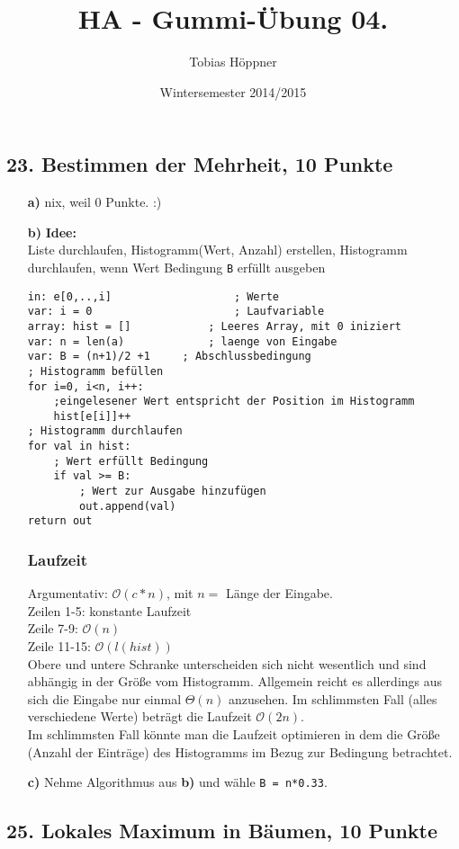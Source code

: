 \documentclass[ngerman,a4paper]{report}
\author{Tobias Höppner}
\title{HA - Gummi-Übung 04. }
\date{Wintersemester 2014/2015}
\renewcommand{\maketitle}{}
\begin{document}
 
\maketitle 

\subsection*{23. Bestimmen der Mehrheit, 10 Punkte}

\begin{enumerate}
\item[\textbf{a)}] nix, weil 0 Punkte. :)
\item[\textbf{b)}] \textbf{Idee:}\\
Liste durchlaufen, Histogramm(Wert, Anzahl) erstellen, Histogramm durchlaufen, wenn Wert Bedingung \lstinline!B! erfüllt ausgeben
\begin{lstlisting}
in: e[0,..,i]					; Werte
var: i = 0						; Laufvariable
array: hist = []			; Leeres Array, mit 0 iniziert
var: n = len(a) 			; laenge von Eingabe
var: B = (n+1)/2 +1		; Abschlussbedingung
; Histogramm befüllen
for i=0, i<n, i++:
	;eingelesener Wert entspricht der Position im Histogramm
	hist[e[i]]++
; Histogramm durchlaufen
for val in hist:
	; Wert erfüllt Bedingung
	if val >= B:
		; Wert zur Ausgabe hinzufügen
		out.append(val)
return out
\end{lstlisting}
\subsubsection*{Laufzeit}
Argumentativ: $\mathcal{O}(c*n)$, mit $n=$ Länge der Eingabe.\\
Zeilen 1-5: konstante Laufzeit\\
Zeile 7-9: $\mathcal{O}(n)$\\
Zeile 11-15: $\mathcal{O}(l(hist))$\\

Obere und untere Schranke unterscheiden sich nicht wesentlich und sind abhängig in der Größe vom Histogramm. Allgemein reicht es allerdings aus sich die Eingabe nur einmal $\Theta(n)$ anzusehen. Im schlimmsten Fall (alles verschiedene Werte) beträgt die Laufzeit $\mathcal{O}(2n)$.\\
Im schlimmsten Fall könnte man die Laufzeit optimieren in dem die Größe (Anzahl der Einträge) des Histogramms im Bezug zur Bedingung betrachtet.\\ 
\item[\textbf{c)}] Nehme Algorithmus aus \textbf{b)} und wähle \lstinline!B = n*0.33!.
\end{enumerate}




\subsection*{25. Lokales Maximum in Bäumen, 10 Punkte}
\end{document}
